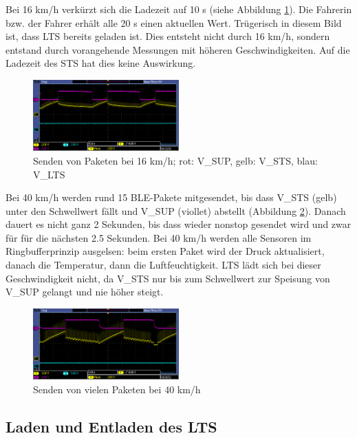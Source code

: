 Bei 16 km/h verkürzt sich die Ladezeit auf 10 s (siehe Abbildung \ref{paket_16kmh}). Die Fahrerin bzw. der Fahrer erhält alle 20 s einen aktuellen Wert. Trügerisch in diesem Bild ist, dass LTS bereits geladen ist. Dies entsteht nicht durch 16 km/h, sondern entstand durch vorangehende Messungen mit höheren Geschwindigkeiten. Auf die Ladezeit des STS hat dies keine Auswirkung.

\begin{figure}[ht]
   \includegraphics[width=0.5\textwidth]{4Resultate/imag/pic2.PNG}
    \caption{Senden von Paketen bei 16 km/h; rot: V\_SUP, gelb: V\_STS, blau: V\_LTS}
    \label{paket_16kmh}
\end{figure}

Bei 40 km/h werden rund 15 BLE-Pakete mitgesendet, bis dass V\_STS (gelb) unter den Schwellwert fällt und V\_SUP (viollet) abstellt (Abbildung \ref{paket_40kmh}). Danach dauert es nicht ganz 2 Sekunden, bis dass wieder nonstop gesendet wird und zwar für für die nächsten 2.5 Sekunden. Bei 40 km/h werden alle Sensoren im Ringbufferprinzip ausgelsen: beim ersten Paket wird der Druck aktualisiert, danach die Temperatur, dann die Luftfeuchtigkeit. LTS lädt sich bei dieser Geschwindigkeit nicht, da V\_STS nur bis zum Schwellwert zur Speisung von V\_SUP gelangt und nie höher steigt.

\begin{figure}[ht]
   \includegraphics[width=0.5\textwidth]{4Resultate/imag/pic4.PNG}
    \caption{Senden von vielen Paketen bei 40 km/h}
    \label{paket_40kmh}
\end{figure}


\subsection{Laden und Entladen des LTS}
\label{res_entladen}

